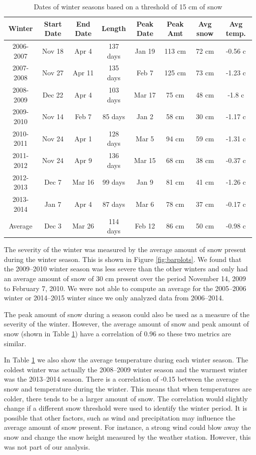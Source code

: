 \documentclass[12pt,twoside]{article}
\begin{document}
{%
\begin{table}[ht]
\centering
{\small
\begin{tabular}{cccccccc}
  \hline
Winter & Start Date & End Date & Length & Peak Date & Peak Amt & Avg snow & Avg temp. \\ 
  \hline
2006-2007 & Nov 18 & Apr 4 & 137 days & Jan 19 & 113 cm & 72 cm & -0.56 c \\ 
  2007-2008 & Nov 27 & Apr 11 & 135 days & Feb 7 & 125 cm & 73 cm & -1.23 c \\ 
  2008-2009 & Dec 22 & Apr 4 & 103 days & Mar 17 & 75 cm & 48 cm & -1.8 c \\ 
  2009-2010 & Nov 14 & Feb 7 & 85 days & Jan 2 & 58 cm & 30 cm & -1.17 c \\ 
  2010-2011 & Nov 24 & Apr 1 & 128 days & Mar 5 & 94 cm & 59 cm & -1.31 c \\ 
  2011-2012 & Nov 24 & Apr 9 & 136 days & Mar 15 & 68 cm & 38 cm & -0.37 c \\ 
  2012-2013 & Dec 7 & Mar 16 & 99 days & Jan 9 & 81 cm & 41 cm & -1.26 c \\ 
  2013-2014 & Jan 7 & Apr 4 & 87 days & Mar 6 & 78 cm & 37 cm & -0.17 c \\ 
  Average & Dec 3 & Mar 26 & 114 days & Feb 12 & 86 cm & 50 cm & -0.98 c \\ 
   \hline
\end{tabular}
}
\caption{Dates of winter seasons based on a threshold of 15 cm of snow} 
\label{tab:summarytable}
\end{table}
\medskip
The severity of the winter was measured by the average amount of snow present during the winter season. This is shown in Figure \ref{fig:barplots}. We found that the 2009--2010 winter season was less severe than the other winters and only had an average amount of snow of 30 cm present over the period November 14, 2009 to February 7, 2010. We were not able to compute an average for the 2005--2006 winter or 2014--2015 winter since we only analyzed data from 2006--2014. 


The peak amount of snow during a season could also be used as a measure of the severity of the winter. However, the average amount of snow and peak amount of snow (shown in Table \ref{tab:summarytable}) have a correlation of 0.96 so these two metrics are similar.


In Table \ref{tab:summarytable} we also show the average temperature during each winter season. The coldest winter was actually the 2008--2009 winter season and the warmest winter was the 2013--2014 season. There is a correlation of -0.15 between the average snow and temperature during the winter. This means that when temperatures are colder, there tends to be a larger amount of snow. The correlation would slightly change if a different snow threshold were used to identify the winter period. It is possible that other factors, such as wind and precipitation may influence the average amount of snow present. For instance, a strong wind could blow away the snow and change the snow height measured by the weather station. However, this was not part of our analysis.


}
\end{document}
